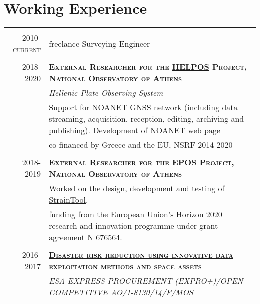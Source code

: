 \documentclass[9pt]{extarticle} %
\begin{document}
\section{Working Experience}
%
\begin{longtable}{r|p{13cm}}
%
\multicolumn{2}{c}{} \\
\textsc{2010-current} & freelance Surveying Engineer\\ 
%
\multicolumn{2}{c}{} \\
\textsc{2018-2020} & \textbf{\textsc{External Researcher for the \href{https://www.epos-ip.org/}{HELPOS} Project, National Observatory of Athens}}\\
  & \textit{\small Hellenic Plate Observing System}\\
  & Support for \href{http://geodesy.gein.noa.gr:8000/nginfo/}{NOANET} GNSS network (including data streaming, acquisition, reception, editing, archiving and publishing). Development of NOANET \href{http://geodesy.gein.noa.gr:8000/nginfo/}{web page}\\
  & co-financed by Greece and the EU, NSRF 2014-2020\\
%
\multicolumn{2}{c}{} \\
\textsc{2018-2019} & \textbf{\textsc{External Researcher for the \href{https://www.epos-ip.org/}{EPOS} Project, National Observatory of Athens}}\\
  & Worked on the design, development and testing of \href{https://dsolab.github.io/StrainTool/}{StrainTool}.\\
  & funding from the European Union’s Horizon 2020 research and innovation programme under grant agreement N 676564.\\
%
\multicolumn{2}{c}{} \\
\textsc{2016-2017} & \textbf{\textsc{\href{http://www.astro.noa.gr/gr/research/projects/esa/}{Disaster risk reduction using innovative data exploitation methods and space assets}}}\\
  & \textit{\small ESA EXPRESS PROCUREMENT (EXPRO+)/OPEN-COMPETITIVE AO/1-8130/14/F/MOS}\\

\end{longtable}
\end{document}

